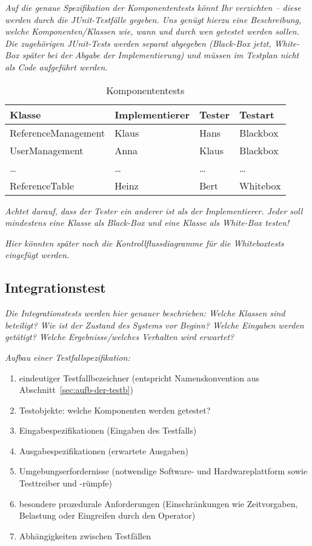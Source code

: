 \documentclass[fontsize=12pt,paper=a4,twoside]{scrartcl}
\begin{document}
{\em Auf die genaue Spezifikation der Komponententests könnt Ihr
  verzichten -- diese werden durch die JUnit-Testfälle gegeben. Uns
  genügt hierzu eine Beschreibung, welche Komponenten/Klassen wie,
  wann und durch wen getestet werden sollen. Die zugehörigen
  JUnit-Tests werden separat abgegeben (Black-Box jetzt, White-Box
  später bei der Abgabe der Implementierung) und müssen im Testplan
  nicht als Code aufgeführt werden.}

\begin{table}[h]
\centering
\begin{tabular}{|l|p{3cm}|p{3cm}|l|}
\hline
Klasse & Implementierer & Tester & Testart \\
\hline
ReferenceManagement & Klaus  & Hans    & Blackbox \\
UserManagement      & Anna   & Klaus   & Blackbox \\
\dots               & \dots  & \dots   & \dots \\
ReferenceTable      & Heinz  & Bert    & Whitebox \\
\hline
\end{tabular}
\caption{Komponententests}
\label{tab:komponententests}
\end{table}

{\em Achtet darauf, dass der Tester ein anderer ist als der
  Implementierer. Jeder soll mindestens eine Klasse als Black-Box und
  eine Klasse als White-Box testen!}

{\em Hier könnten später noch die Kontrollflussdiagramme für die
  Whiteboxtests eingefügt werden.}

\clearpage
\subsection{Integrationstest}\label{c10a}

{\em Die Integrationstests werden hier genauer beschrieben: Welche
  Klassen sind beteiligt? Wie ist der Zustand des Systems vor Beginn?
  Welche Eingaben werden getätigt? Welche Ergebnisse/welches Verhalten
  wird erwartet?}

{\em Aufbau einer Testfallspezifikation:
\begin{enumerate}
\item eindeutiger Testfallbezeichner (entspricht Namenskonvention aus Abschnitt~\ref{sec:aufb-der-testb})
\item Testobjekte: welche Komponenten werden getestet?
\item Eingabespezifikationen (Eingaben des Testfalls)
\item Ausgabespezifikationen (erwartete Ausgaben)
\item Umgebungserfordernisse (notwendige Software- und
  Hardwareplattform sowie Testtreiber und -rümpfe)
\item besondere prozedurale Anforderungen (Einschränkungen wie
  Zeitvorgaben, Belastung oder Eingreifen durch den Operator)
\item Abhängigkeiten zwischen Testfällen
\end{enumerate}
}
\end{document}
